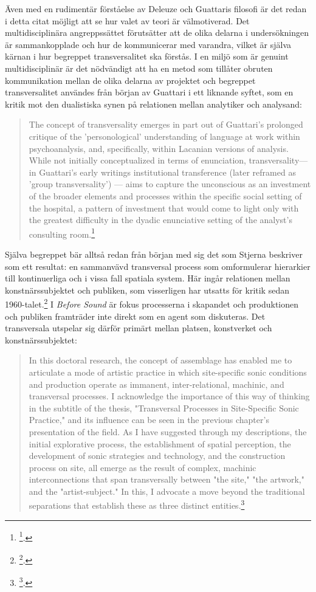 \documentclass[11pt]{article}
\begin{document}
Även med en rudimentär förståelse av Deleuze och Guattaris filosofi är
det redan i detta citat möjligt att se hur valet av teori är
välmotiverad. Det multidisciplinära angreppssättet förutsätter att de
olika delarna i undersökningen är sammankopplade och hur de kommunicerar
med varandra, vilket är själva kärnan i hur begreppet transversalitet
ska förstås. I en miljö som är genuint multidisciplinär är det
nödvändigt att ha en metod som tillåter obruten kommunikation mellan de
olika delarna av projektet och begreppet transversalitet användes från
början av Guattari i ett liknande syftet, som en kritik mot den
dualistiska synen på relationen mellan analytiker och analysand:

\begin{quote}
The concept of transversality emerges in part out of Guattari's
prolonged critique of the 'personological' understanding of language
at work within psychoanalysis, and, specifically, within Lacanian
versions of analysis. While not initially conceptualized in terms of
enunciation, transversality---in Guattari's early writings
institutional transference (later reframed as 'group transversality')
--- aims to capture the unconscious as an investment of the broader
elements and processes within the specific social setting of the
hospital, a pattern of investment that would come to light only with
the greatest difficulty in the dyadic enunciative setting of the
analyst's consulting room.\footnote{\footcite[s.234]{Goffey2015}.}
\end{quote}

Själva begreppet bär alltså redan från början med sig det som Stjerna
beskriver som ett resultat: en sammanvävd transversal process som
omformulerar hierarkier till kontinuerliga och i vissa fall spatiala
system. Här ingår relationen mellan konstnärssubjektet och publiken, som
visserligen har utsatts för kritik sedan 1960-talet.\footnote{\footcite[s.48]{Stjerna2018}.} I \emph{Before
Sound} är fokus processerna i skapandet och produktionen och publiken
framträder inte direkt som en agent som diskuteras. Det transversala
utspelar sig därför primärt mellan platsen, konstverket och
konstnärssubjektet:

\begin{quote}
In this doctoral research, the concept of assemblage has enabled me to
articulate a mode of artistic practice in which site-specific sonic
conditions and production operate as immanent, inter-relational,
machinic, and transversal processes. I acknowledge the importance of
this way of thinking in the subtitle of the thesis, "Transversal
Processes in Site-Specific Sonic Practice," and its influence can be
seen in the previous chapter's presentation of the field. As I have
suggested through my descriptions, the initial explorative process,
the establishment of spatial perception, the development of sonic
strategies and technology, and the construction process on site, all
emerge as the result of complex, machinic interconnections that span
transversally between "the site," "the artwork," and the
"artist-subject." In this, I advocate a move beyond the traditional
separations that establish these as three distinct entities.\footnote{\footcite[s.92]{Stjerna2018}.}
\end{quote}
\end{document}
